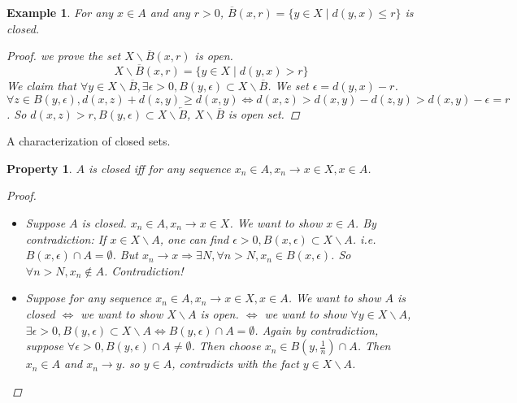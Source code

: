 \documentclass{article}
\newtheorem*{property}{Property}
\newtheorem*{example}{Example}
\begin{document}
\begin{example}
    For any $x \in A$ and any $r > 0$, $\overline{B}(x, r) = \{y \in X \mid d(y, x) \le r\}$ is closed.
    \begin{proof}
        we prove the set $X \backslash \overline{B}(x, r)$ is open.
        \[
            X \backslash \overline{B}(x, r) = \{y \in X \mid d(y, x) > r\}
        \]
        We claim that $\forall y \in X \backslash \overline{B}, \exists \epsilon > 0, B(y, \epsilon) \subset X \backslash \overline{B}$.
        We set $\epsilon = d(y, x) - r$.
        $\forall z \in B(y, \epsilon), d(x, z) + d(z, y) \ge d(x, y) \Leftrightarrow d(x, z) > d(x, y) - d(z, y) > d(x, y) - \epsilon = r$.
        So $d(x, z) > r, B(y, \epsilon) \subset X \backslash \overleftarrow{B}$,
        $X \backslash \overline{B}$ is open set.
    \end{proof}
\end{example}
A characterization of closed sets.
\begin{property}
    $A$ is closed iff for any sequence $x_n \in A, x_n \rightarrow x \in X, x \in A$.
    \begin{proof} \hfill
        \begin{itemize}
            \item Suppose $A$ is closed. $x_n \in A, x_n \rightarrow x \in X$. We want to show $x \in A$. 
            By contradiction: If $x \in X \backslash A$, one can find $\epsilon > 0, B(x, \epsilon) \subset X \backslash A$.
            i.e. $B(x, \epsilon) \cap A = \emptyset$.
            But $x_n \rightarrow x \Rightarrow \exists N, \forall n > N, x_n \in B(x, \epsilon)$.
            So $\forall n > N, x_n \notin A$. Contradiction!
            \item Suppose for any sequence $x_n \in A, x_n \rightarrow x \in X, x \in A$.
            We want to show $A$ is closed $\Leftrightarrow$ we want to show $X \backslash A$ is open.
            $\Leftrightarrow$ we want to show $\forall y \in X \backslash A$, 
            $\exists \epsilon > 0, B(y, \epsilon) \subset X \backslash A \Leftrightarrow B(y, \epsilon) \cap A = \emptyset$.
            Again by contradiction, suppose $\forall \epsilon > 0, B(y, \epsilon) \cap A \ne \emptyset$.
            Then choose $x_n \in B(y, \frac{1}{n}) \cap A$. Then $x_n \in A$ and $x_n \rightarrow y$. 
            so $y \in A$, contradicts with the fact $y \in X \backslash A$.
        \end{itemize}
    \end{proof}
\end{property}
\end{document}
